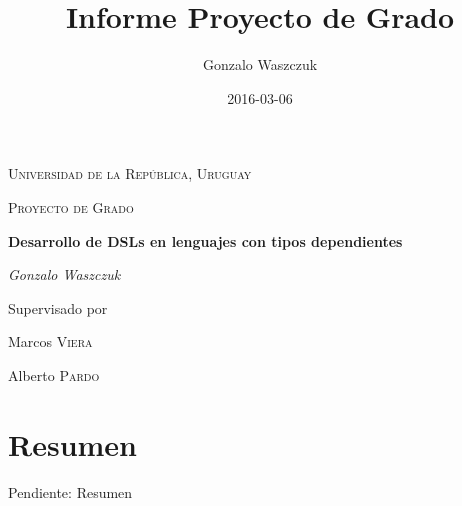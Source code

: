 \documentclass[a4paper,oneside,openany]{book}
\title{Informe Proyecto de Grado}
\author{Gonzalo Waszczuk}
\begin{document}
\frontmatter

\begin{titlepage}
	\centering
	{\scshape\LARGE Universidad de la República, Uruguay \par}
	\vspace{1cm}
	{\scshape\Large Proyecto de Grado\par}
	\vspace{1.5cm}
	{\huge\bfseries Desarrollo de DSLs en lenguajes con tipos dependientes\par}
	\vspace{2cm}
	{\Large\itshape Gonzalo Waszczuk\par}
	\vfill
	Supervisado por\par
	Marcos \textsc{Viera}\par
        Alberto \textsc{Pardo}
	\vfill

	{\large \date{2016-03-06}\par}
\end{titlepage}

\chapter*{Resumen}

Pendiente: Resumen

\tableofcontents


\mainmatter

\cleardoublepage

















\backmatter


\printbibliography

\end{document}
